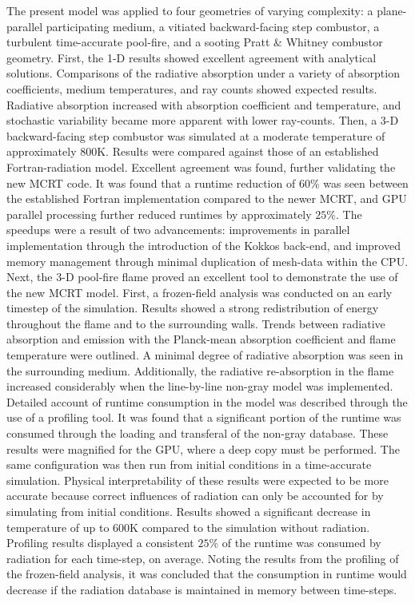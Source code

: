 The present model was applied to four geometries of varying complexity: a plane-parallel participating medium, a vitiated backward-facing step combustor, a turbulent time-accurate pool-fire, and a sooting Pratt \& Whitney combustor geometry.
First, the 1-D results showed excellent agreement with analytical solutions. Comparisons of the radiative absorption under a variety of absorption coefficients, medium temperatures, and ray counts showed expected results. Radiative absorption increased with absorption coefficient and temperature, and stochastic variability became more apparent with lower ray-counts.
Then, a 3-D backward-facing step combustor was simulated at a moderate temperature of approximately $800$K. Results were compared against those of an established Fortran-radiation model. Excellent agreement was found, further validating the new MCRT code. It was found that a runtime reduction of $60$\% was seen between the established Fortran implementation compared to the newer MCRT, and GPU parallel processing further reduced runtimes by approximately $25$\%. The speedups were a result of two advancements: improvements in parallel implementation through the introduction of the Kokkos back-end, and improved memory management through minimal duplication of mesh-data within the CPU.
Next, the 3-D pool-fire flame proved an excellent tool to demonstrate the use of the new MCRT model. First, a frozen-field analysis was conducted on an early timestep of the simulation. Results showed a strong redistribution of energy throughout the flame and to the surrounding walls. Trends between radiative absorption and emission with the Planck-mean absorption coefficient and flame temperature were outlined. A minimal degree of radiative absorption was seen in the surrounding medium. Additionally, the radiative re-absorption in the flame increased considerably when the line-by-line non-gray model was implemented. Detailed account of runtime consumption in the model was described through the use of a profiling tool. It was found that a significant portion of the runtime was consumed through the loading and transferal of the non-gray database. These results were magnified for the GPU, where a deep copy must be performed.
The same configuration was then run from initial conditions in a time-accurate simulation. Physical interpretability of these results were expected to be more accurate because correct influences of radiation can only be accounted for by simulating from initial conditions. Results showed a significant decrease in temperature of up to $600$K compared to the simulation without radiation. Profiling results displayed a consistent $25$\% of the runtime was consumed by radiation for each time-step, on average. Noting the results from the profiling of the frozen-field analysis, it was concluded that the consumption in runtime would decrease if the radiation database is maintained in memory between time-steps.
